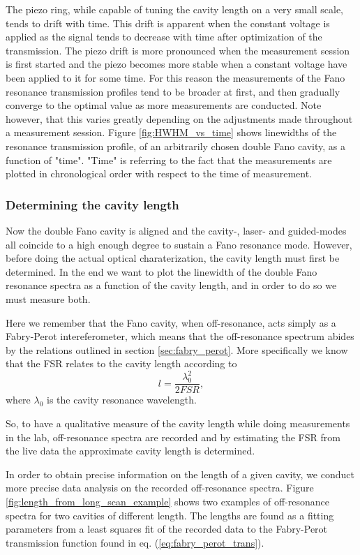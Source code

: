 The piezo ring, while capable of tuning the cavity length on a very small scale, tends to drift with time. This drift is apparent when the constant voltage is applied as the signal tends to decrease with time after optimization of the transmission. The piezo drift is more pronounced when the measurement session is first started and the piezo becomes more stable when a constant voltage have been applied to it for some time. For this reason the measurements of the Fano resonance transmission profiles tend to be broader at first, and then gradually converge to the optimal value as more measurements are conducted. Note however, that this varies greatly depending on the adjustments made throughout a measurement session. Figure \ref{fig:HWHM_vs_time} shows linewidths of the resonance transmission profile, of an arbitrarily chosen double Fano cavity, as a function of "time". "Time" is referring to the fact that the measurements are plotted in chronological order with respect to the time of measurement. 

\subsubsection{Determining the cavity length}

Now the double Fano cavity is aligned and the cavity-, laser- and guided-modes all coincide to a high enough degree to sustain a Fano resonance mode. However, before doing the actual optical charaterization, the cavity length must first be determined. In the end we want to plot the linewidth of the double Fano resonance spectra as a function of the cavity length, and in order to do so we must measure both. 

Here we remember that the Fano cavity, when off-resonance, acts simply as a Fabry-Perot intereferometer, which means that the off-resonance spectrum abides by the relations outlined in section \ref{sec:fabry_perot}. More specifically we know that the FSR relates to the cavity length according to
\begin{equation}
    l = \frac{\lambda_0^2}{2 FSR},
    \label{eq:cavity_length_from_fsr}
\end{equation}
where $\lambda_0$ is the cavity resonance wavelength. 

So, to have a qualitative measure of the cavity length while doing measurements in the lab, off-resonance spectra are recorded and by estimating the FSR from the live data the approximate cavity length is determined.  

In order to obtain precise information on the length of a given cavity, we conduct more precise data analysis on the recorded off-resonance spectra. Figure \ref{fig:length_from_long_scan_example} shows two examples of off-resonance spectra for two cavities of different length. The lengths are found as a fitting parameters from a least squares fit of the recorded data to the Fabry-Perot transmission function found in eq. (\ref{eq:fabry_perot_trans}). 

